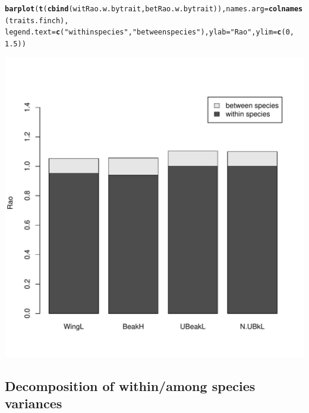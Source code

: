 \documentclass[12pt]{article}\usepackage[]{graphicx}\usepackage[]{color}
\makeatletter
\def\maxwidth{ %
  \ifdim\Gin@nat@width>\linewidth
    \linewidth
  \else
    \Gin@nat@width
  \fi
}
\newcommand{\hlnum}[1]{\textcolor[rgb]{0.686,0.059,0.569}{#1}}%
\newcommand{\hlstr}[1]{\textcolor[rgb]{0.192,0.494,0.8}{#1}}%
\newcommand{\hlstd}[1]{\textcolor[rgb]{0.345,0.345,0.345}{#1}}%
\newcommand{\hlkwc}[1]{\textcolor[rgb]{0.333,0.667,0.333}{#1}}%
\newcommand{\hlkwd}[1]{\textcolor[rgb]{0.737,0.353,0.396}{\textbf{#1}}}%
\newenvironment{kframe}{%
 \def\at@end@of@kframe{}%
 \ifinner\ifhmode%
  \def\at@end@of@kframe{\end{minipage}}%
  \begin{minipage}{\columnwidth}%
 \fi\fi%
 \def\FrameCommand##1{\hskip\@totalleftmargin \hskip-\fboxsep
 \colorbox{shadecolor}{##1}\hskip-\fboxsep
     \hskip-\linewidth \hskip-\@totalleftmargin \hskip\columnwidth}%
 \MakeFramed {\advance\hsize-\width
   \@totalleftmargin\z@ \linewidth\hsize
   \@setminipage}}%
 {\par\unskip\endMakeFramed%
 \at@end@of@kframe}
\newenvironment{knitrout}{}{} %
\makeatother
\begin{document}
\begin{knitrout}
\color{fgcolor}\begin{kframe}
\begin{alltt}
\hlkwd{barplot}\hlstd{(}\hlkwd{t}\hlstd{(}\hlkwd{cbind}\hlstd{(witRao.w.bytrait, betRao.w.bytrait)),} \hlkwc{names.arg} \hlstd{=} \hlkwd{colnames}\hlstd{(traits.finch),}
    \hlkwc{legend.text} \hlstd{=} \hlkwd{c}\hlstd{(}\hlstr{"within species"}\hlstd{,} \hlstr{"between species"}\hlstd{),} \hlkwc{ylab} \hlstd{=} \hlstr{"Rao"}\hlstd{,} \hlkwc{ylim} \hlstd{=} \hlkwd{c}\hlstd{(}\hlnum{0}\hlstd{,}
        \hlnum{1.5}\hlstd{))}
\end{alltt}
\end{kframe}
\includegraphics[width=\maxwidth]{figure/unnamed-chunk-13} 

\end{knitrout}



\subsection{Decomposition of within/among species variances}
\end{document}

